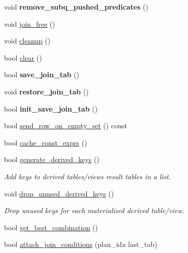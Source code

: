 \begin{DoxyCompactItemize}
\item 
void {\bfseries remove\+\_\+subq\+\_\+pushed\+\_\+predicates} ()
\item 
void \mbox{\hyperlink{group__Query__Optimizer_gaa62d47da29f3853e87b1069ee5c1ff21}{join\+\_\+free}} ()
\item 
void \mbox{\hyperlink{group__Query__Optimizer_ga633799af14ae0a6e3abbac98b428c46f}{cleanup}} ()
\item 
bool \mbox{\hyperlink{group__Query__Optimizer_gacff1c1a49375e2f52301214084924bf3}{clear}} ()
\item 
\mbox{\label{classJOIN_a5af6119a4837a9d4c46889c50a86f6d0}} 
bool {\bfseries save\+\_\+join\+\_\+tab} ()
\item 
\mbox{\label{classJOIN_a3f009002c1a2d995fddaf6a3cc262944}} 
void {\bfseries restore\+\_\+join\+\_\+tab} ()
\item 
\mbox{\label{classJOIN_afe6e128f38e17719d85a215c03e4481a}} 
bool {\bfseries init\+\_\+save\+\_\+join\+\_\+tab} ()
\item 
bool \mbox{\hyperlink{classJOIN_a1db66213c1a83ccccd913b4173a28a85}{send\+\_\+row\+\_\+on\+\_\+empty\+\_\+set}} () const
\item 
bool \mbox{\hyperlink{group__Query__Optimizer_ga4408ac7e9a04a594110d2009cfcd54c9}{cache\+\_\+const\+\_\+exprs}} ()
\item 
bool \mbox{\hyperlink{group__Query__Optimizer_ga92bf64a03ec666f565627fbb48ba4677}{generate\+\_\+derived\+\_\+keys}} ()
\begin{DoxyCompactList}\small\item\em Add keys to derived tables\textquotesingle{}/views\textquotesingle{} result tables in a list. \end{DoxyCompactList}\item 
void \mbox{\hyperlink{group__Query__Optimizer_ga54392f4f40ec2c57b8263f22fa3d4296}{drop\+\_\+unused\+\_\+derived\+\_\+keys}} ()
\begin{DoxyCompactList}\small\item\em Drop unused keys for each materialized derived table/view. \end{DoxyCompactList}\item 
bool \mbox{\hyperlink{group__Query__Optimizer_gae9c1cf0874f4bda777557d012148e059}{get\+\_\+best\+\_\+combination}} ()
\item 
bool \mbox{\hyperlink{group__Query__Optimizer_gaaea10268473cae92c3bdbcf0ea4f97cc}{attach\+\_\+join\+\_\+conditions}} (plan\+\_\+idx last\+\_\+tab)

\end{DoxyCompactItemize}
